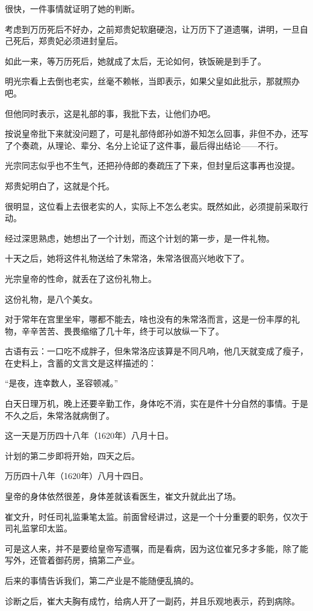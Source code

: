 \begin{multicols}{\theparacolNo}
很快，一件事情就证明了她的判断。

考虑到万历死后不好办，之前郑贵妃软磨硬泡，让万历下了道遗嘱，讲明，一旦自己死后，郑贵妃必须进封皇后。

如此一来，等万历死后，她就成了太后，无论如何，铁饭碗是到手了。

明光宗看上去倒也老实，丝毫不赖帐，当即表示，如果父皇如此批示，那就照办吧。

但他同时表示，这是礼部的事，我批下去，让他们办吧。

按说皇帝批下来就没问题了，可是礼部侍郎孙如游不知怎么回事，非但不办，还写了个奏疏，从理论、辈分、名分上论证了这件事，最后得出结论——不行。

光宗同志似乎也不生气，还把孙侍郎的奏疏压了下来，但封皇后这事再也没提。

郑贵妃明白了，这就是个托。

很明显，这位看上去很老实的人，实际上不怎么老实。既然如此，必须提前采取行动。

经过深思熟虑，她想出了一个计划，而这个计划的第一步，是一件礼物。

十天之后，她将这件礼物送给了朱常洛，朱常洛很高兴地收下了。

光宗皇帝的性命，就丢在了这份礼物上。

这份礼物，是八个美女。

对于常年在宫里坐牢，哪都不能去，啥也没有的朱常洛而言，这是一份丰厚的礼物，辛辛苦苦、畏畏缩缩了几十年，终于可以放纵一下了。

古语有云：一口吃不成胖子，但朱常洛应该算是不同凡响，他几天就变成了瘦子，在史料上，含蓄的文言文是这样描述的：

“是夜，连幸数人，圣容顿减。”

白天日理万机，晚上还要辛勤工作，身体吃不消，实在是件十分自然的事情。于是不久之后，朱常洛就病倒了。

这一天是万历四十八年（1620年）八月十日。

计划的第二步即将开始，四天之后。

万历四十八年（1620年）八月十四日。

皇帝的身体依然很差，身体差就该看医生，崔文升就此出了场。

崔文升，时任司礼监秉笔太监。前面曾经讲过，这是一个十分重要的职务，仅次于司礼监掌印太监。

可是这人来，并不是要给皇帝写遗嘱，而是看病，因为这位崔兄多才多能，除了能写外，还管着御药房，搞第二产业。

后来的事情告诉我们，第二产业是不能随便乱搞的。

诊断之后，崔大夫胸有成竹，给病人开了一副药，并且乐观地表示，药到病除。


\end{multicols}

